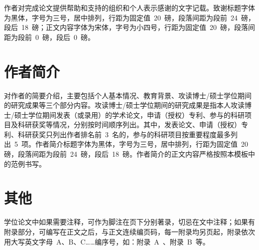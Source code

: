 作者对完成论文提供帮助和支持的组织和个人表示感谢的文字记载。致谢标题字体为黑体，字号为三号，居中排列，行距为固定值~20~磅，段落间距为段前~24~磅，段后~18~磅；正文内容字体为宋体，字号为小四号，行距为固定值~20~磅，段落间距为段前~0~磅，段后~0~磅。

\section{作者简介}

对作者的简要介绍，主要包括个人基本情况、教育背景、攻读博士/硕士学位期间的研究成果等三个部分内容。攻读博士/硕士学位期间的研究成果是指本人攻读博士/硕士学位期间发表（或录用）的学术论文，申请（授权）专利、参与的科研项目及科研获奖等情况，分别按时间顺序列出。其中，发表论文、申请（授权）专利、科研获奖只列出作者排名前~3~名的，参与的科研项目按重要程度最多列出~5~项。作者简介标题字体为黑体，字号为三号，居中排列，行距为固定值~20~ 磅，段落间距为段前~24~磅，段后~18~磅。作者简介的正文内容严格按照本模板中的范例书写。

\section{其他}

学位论文中如果需要注释，可作为脚注在页下分别著录，切忌在文中注释；如果有附录部分，可编写在正文之后，与正文连续编页码，每一附录均另页起，附录依次用大写英文字母~A、B、C……编序号，如：附录~A~、附录~B~等。
